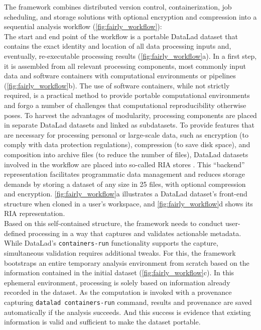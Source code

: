 The framework combines distributed version control, containerization, job scheduling, and storage solutions with optional encryption and compression into a sequential analysis workflow (\cref{fig:fairly_workflow}):\\
The start and end point of the workflow is a portable DataLad dataset that contains the exact identity and location of all data processing inputs and, eventually, re-executable processing results (\cref{fig:fairly_workflow}a).
In a first step, it is assembled from all relevant processing components, most commonly input data and software containers with computational environments or pipelines (\cref{fig:fairly_workflow}b).
The use of software containers, while not strictly required, is a practical method to provide portable computational environments and forgo a number of challenges that computational reproducibility otherwise poses.
To harvest the advantages of modularity, processing components are placed in separate DataLad datasets and linked as subdatasets.
To provide features that are necessary for processing personal or large-scale data, such as encryption (to comply with data protection regulations), compression (to save disk space), and composition into archive files (to reduce the number of files),
DataLad datasets involved in the workflow are placed into so-called RIA stores \citep{poldrackRIA}.
This ``backend'' representation facilitates programmatic data management and reduces storage demands by storing a dataset of any size in 25 files, with optional compression and encryption.
\cref{fig:fairly_workflow}a illustrates a DataLad dataset's front-end structure when cloned in a user's workspace, and \cref{fig:fairly_workflow}d shows its RIA representation.\\
Based on this self-contained structure, the framework needs to conduct user-defined processing in a way that captures and validates actionable metadata.
While DataLad's \texttt{containers-run} functionality supports the capture, simultaneous validation requires additional tweaks.
For this, the framework bootstraps an entire temporary analysis environment from scratch based on the information contained in the initial dataset (\cref{fig:fairly_workflow}c).
In this ephemeral environment, processing is solely based on information already recorded in the dataset.
As the computation is invoked with a provenance capturing \texttt{datalad containers-run} command, results and provenance are saved automatically if the analysis succeeds.
And this success is evidence that existing information is valid and sufficient to make the dataset portable.\\
